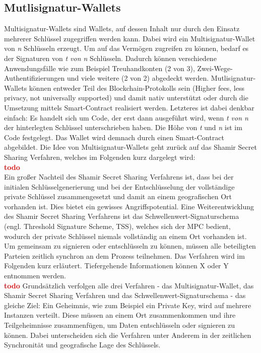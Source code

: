 \subsection{Mutlisignatur-Wallets}
\label{subsec:fundamentals:dlt:multisig}
Multisignatur-Wallets sind Wallets, auf dessen Inhalt nur durch den Einsatz mehrerer Schlüssel zugegriffen werden kann. Dabei wird ein Multisignatur-Wallet von \textit{n} Schlüsseln erzeugt. Um auf das Vermögen zugreifen zu können, bedarf es der Signaturen von \textit{t von n} Schlüsseln. Dadurch können verschiedene Anwendungsfälle wie zum Beispiel Treuhandkonten (2 von 3), Zwei-Wege-Authentifizierungen und viele weitere (2 von 2) abgedeckt werden. Mutlisignatur-Wallets können entweder Teil des Blockchain-Protokolls sein (Higher fees, less privacy, not universally supported) und damit nativ unterstützt oder durch die Umsetzung mittels Smart-Contract realisiert werden. Letzteres ist dabei denkbar einfach: Es handelt sich um Code, der erst dann ausgeführt wird, wenn \textit{t von n} der hinterlegten Schlüssel unterschrieben haben. Die Höhe von \textit{t} und \textit{n} ist im Code festgelegt. Das Wallet wird demnach durch einen Smart-Contract abgebildet. Die Idee von Multisignatur-Wallets geht zurück auf das Shamir Secret Sharing Verfahren, welches im Folgenden kurz dargelegt wird:\\
\textbf{\textcolor{red}{todo}}\\
Ein großer Nachteil des Shamir Secret Sharing Verfahrens ist, dass bei der initialen Schlüsselgenerierung und bei der Entschlüsselung der vollständige private Schlüssel zusammengesetzt und damit an einem geografischen Ort vorhanden ist. Dies bietet ein gewisses Angriffspotential. Eine Weiterentwicklung des Shamir Secret Sharing Verfahrens ist das Schwellenwert-Signaturschema (engl. Threshold Signature Scheme, TSS), welches sich der \ac{MPC} bedient, wodurch der private Schlüssel niemals vollständig an einem Ort vorhanden ist. Um gemeinsam zu signieren oder entschlüsseln zu können, müssen alle beteiligten Parteien zeitlich synchron an dem Prozess teilnehmen. Das Verfahren wird im Folgenden kurz erläutert. Tiefergehende Informationen können X oder Y entnommen werden.\\
\textbf{\textcolor{red}{todo}}
Grundsätzlich verfolgen alle drei Verfahren - das Multisignatur-Wallet, das Shamir Secret Sharing Verfahren und das Schwellenwert-Signaturschema - das gleiche Ziel: Ein Geheimnis, wie zum Beispiel ein Private Key, wird auf mehrere Instanzen verteilt. Diese müssen an einem Ort zusammenkommen und ihre Teilgeheimnisse zusammenfügen, um Daten entschlüsseln oder signieren zu können. Dabei unterscheiden sich die Verfahren unter Anderem in der zeitlichen Synchronität und geografische Lage des Schlüssels.


